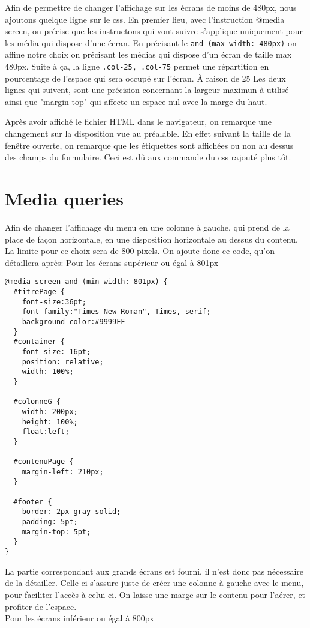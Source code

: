 Afin de permettre de changer l'affichage sur les écrans de moins de 480px, nous ajoutons quelque ligne sur le css.
En premier lieu, avec l'instruction @media screen, on précise que les instructons qui vont suivre s'applique uniquement pour les média qui dispose d'une écran.
En précisant le \texttt{and (max-width: 480px)} on affine notre choix on précisant les médias qui dispose d'un écran de taille max = 480px.
Suite à ça, la ligne \texttt{.col-25, .col-75} permet une répartition en pourcentage de l'espace qui sera occupé sur l'écran. À raison de 25%
Les deux lignes qui suivent, sont une précision concernant la largeur maximun à utilisé ainsi que "margin-top" qui affecte un espace nul avec la marge du haut.

Après avoir affiché le fichier HTML dans le navigateur, on remarque une changement sur la disposition vue au préalable. En effet suivant la taille de la fenêtre ouverte, on remarque que les étiquettes sont affichées ou non au dessus des champs du formulaire. Ceci est dû aux commande du css rajouté plus tôt.


\section{Media queries} %
Afin de changer l'affichage du menu en une colonne à gauche, qui prend de la place de façon horizontale, en une disposition horizontale au dessus du contenu. La limite pour ce choix sera de 800 pixels.
On ajoute donc ce code, qu'on détaillera après:
 Pour les écrans supérieur ou égal à 801px
\begin{verbatim}
@media screen and (min-width: 801px) {
  #titrePage {
    font-size:36pt;
    font-family:"Times New Roman", Times, serif;
    background-color:#9999FF
  }
  #container {
    font-size: 16pt;
    position: relative;
    width: 100%;
  }

  #colonneG {
    width: 200px;
    height: 100%;
    float:left;
  }

  #contenuPage {
    margin-left: 210px;
  }

  #footer {
    border: 2px gray solid;
    padding: 5pt;
    margin-top: 5pt;
  }
}
\end{verbatim}
La partie correspondant aux grands écrans est fourni, il n'est donc pas nécessaire de la détailler. Celle-ci s'assure juste de créer une colonne à gauche avec le menu, pour faciliter l'accès à celui-ci. On laisse une marge sur le contenu pour l'aérer, et profiter de l'espace.\\
Pour les écrans inférieur ou égal à 800px

